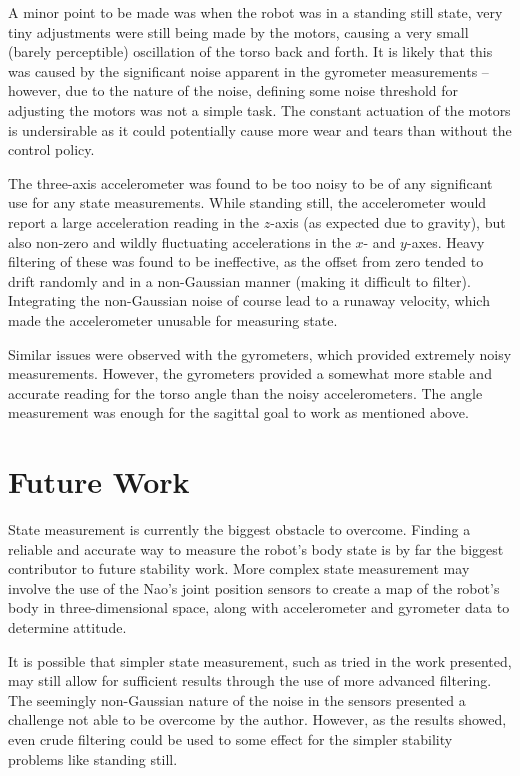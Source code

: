 A minor point to be made was when the robot was in a standing still state, very tiny adjustments were still being made by the motors, causing a very small (barely perceptible) oscillation of the torso back and forth. It is likely that this was caused by the significant noise apparent in the gyrometer measurements -- however, due to the nature of the noise, defining some noise threshold for adjusting the motors was not a simple task. The constant actuation of the motors is undersirable as it could potentially cause more wear and tears than without the control policy.

The three-axis accelerometer was found to be too noisy to be of any significant use for any state measurements. While standing still, the accelerometer would report a large acceleration reading in the $z$-axis (as expected due to gravity), but also non-zero and wildly fluctuating accelerations in the $x$- and $y$-axes. Heavy filtering of these was found to be ineffective, as the offset from zero tended to drift randomly and in a non-Gaussian manner (making it difficult to filter). Integrating the non-Gaussian noise of course lead to a runaway velocity, which made the accelerometer unusable for measuring state.

Similar issues were observed with the gyrometers, which provided extremely noisy measurements. However, the gyrometers provided a somewhat more stable and accurate reading for the torso angle than the noisy accelerometers. The angle measurement was enough for the sagittal goal to work as mentioned above.

\section{Future Work}

State measurement is currently the biggest obstacle to overcome. Finding a reliable and accurate way to measure the robot's body state is by far the biggest contributor to future stability work. More complex state measurement may involve the use of the Nao's joint position sensors to create a map of the robot's body in three-dimensional space, along with accelerometer and gyrometer data to determine attitude.

It is possible that simpler state measurement, such as tried in the work presented, may still allow for sufficient results through the use of more advanced filtering. The seemingly non-Gaussian nature of the noise in the sensors presented a challenge not able to be overcome by the author. However, as the results showed, even crude filtering could be used to some effect for the simpler stability problems like standing still.

